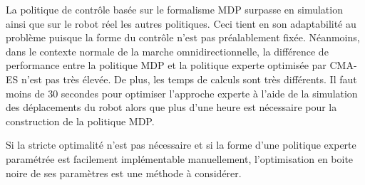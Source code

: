 La politique de contrôle basée sur le formalisme MDP surpasse
en simulation ainsi que sur le robot réel les autres politiques.
Ceci tient en son adaptabilité au problème puisque la forme du 
contrôle n'est pas préalablement fixée.
Néanmoins, dans le contexte normale de la marche omnidirectionnelle, 
la différence de performance entre la politique MDP et la politique 
experte optimisée par CMA-ES n'est pas très élevée.
De plus, les temps de calculs sont très différents.
Il faut moins de $30$ secondes pour optimiser l'approche experte 
à l'aide de la simulation des déplacements du robot alors 
que plus d'une heure est nécessaire pour la construction
de la politique MDP.

Si la stricte optimalité n'est pas nécessaire et si la forme d'une politique
experte paramétrée est facilement implémentable manuellement, 
l'optimisation en boite noire de ses paramètres est une méthode à considérer.

